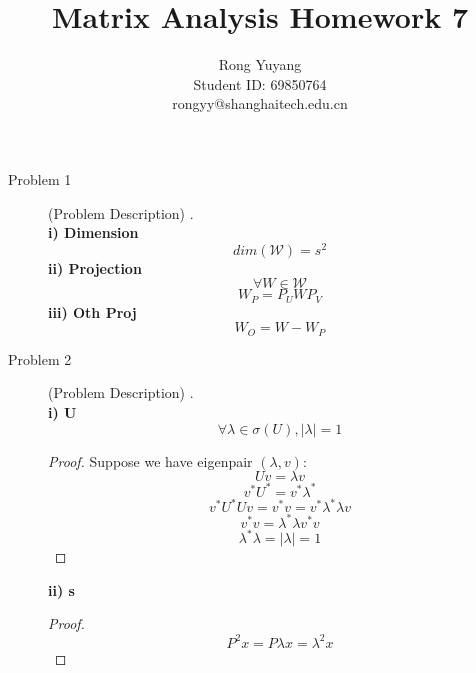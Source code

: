 \documentclass{article}
\title{Matrix Analysis Homework 7}
\author{Rong Yuyang \\ Student ID: 69850764 \\ rongyy@shanghaitech.edu.cn}
\begin{document}
\maketitle

\begin{description}
	\item[Problem 1] (Problem Description)
	.\\
	\textbf{i) Dimension}
		$$dim(\mathcal{W}) = s^2$$
	\textbf{ii) Projection}
		$$\forall W \in \mathcal{W}$$
		$$W_P = P_UWP_V$$
	\textbf{iii) Oth Proj}
		$$W_O = W - W_P$$

	\item[Problem 2] (Problem Description)
	.\\
	\textbf{i) U}
	$$\forall \lambda \in \sigma(U), |\lambda| = 1$$
	\begin{proof}
		Suppose we have eigenpair $(\lambda, v)$:
		$$ Uv = \lambda v$$
		$$ v^*U^* = v^*\lambda^*$$
		$$ v^*U^* Uv = v^*v = v^*\lambda^*\lambda v$$
		$$ v^*v = \lambda^*\lambda v^*v$$
		$$ \lambda^*\lambda = |\lambda| = 1$$
	\end{proof}
	\textbf{ii) s}
	\begin{proof}
		$$P^2x = P\lambda x = \lambda^2 x$$
	\end{proof}

\end{description}
\end{document}
